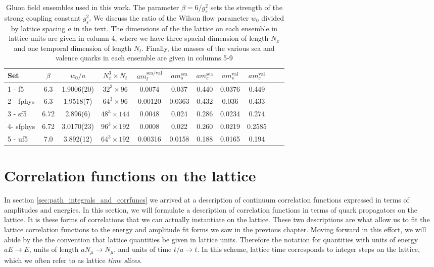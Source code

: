 \begin{table}
\caption{Gluon field ensembles used in this work.  The parameter $\beta=6/g_s^2$ sets the strength of the strong coupling constant $g_s^2$.  We discuss the ratio of the Wilson flow parameter $w_0$ divided by lattice spacing $a$ in the text.  The dimensions of the the lattice on each ensemble in lattice units are given in column 4, where we have three spacial dimension of length $N_x$ and one temporal dimension of length $N_t$.  Finally, the masses of the various sea and valence quarks in each ensemble are given in columns 5-9}%
\begin{center} 
\begin{tabular}{l c c c c c c c c c c}
\hline
    Set & $\beta$ & $w_0/a$ &  $N_x^3\times N_t$  &    $am_{l}^{\mathrm{sea/val}}$ & $am_{s}^{\mathrm{sea}}$ & $am_c^{\mathrm{sea}}$& $am_{s}^{\mathrm{val}}$ & $am_c^{\mathrm{val}}$ \\
\hline
\hline
    1 - f5   &  6.3    &  1.9006(20)   & $32^3\times 96$  &    0.0074       &   0.037        &  0.440&  0.0376  &  0.449 \\
\hline
    2 - fphys   &  6.3  & 1.9518(7)   & $64^3\times 96$    &   0.00120       &  0.0363         &  0.432&   0.036  &  0.433 \\
\hline
    3 - sf5   & 6.72    &  2.896(6)  & $48^3\times 144$    &   0.0048       &  0.024         &  0.286& 0.0234 &  0.274 \\
\hline
    4- sfphys   &  6.72 & 3.0170(23)   & $96^3\times 192$    &   0.0008       &  0.022         &  0.260&   0.0219  &  0.2585 \\
\hline
    5 - uf5   &  7.0    &   3.892(12) & $64^3\times 192$    &  0.00316       &  0.0158         &  0.188& 0.0165 &  0.194 \\
\hline
\hline
\end{tabular}
\end{center}
\label{tab:ensembles}
\end{table}

\section{Correlation functions on the lattice}\label{sec:correlation_functions_lattice}
In section \ref{sec:path_integrals_and_corrfuncs} we arrived at a description of continuum correlation functions expressed in terms of amplitudes and energies.  In this section, we will  formulate a description of correlation functions in terms of quark propagators on the lattice.  It is these forms of correlations that we can actually instantiate on the lattice.  These two descriptions are what allow us to fit the lattice correlation functions to the energy and amplitude fit forms we saw in the previous chapter.  Moving forward in this effort, we will abide by the the convention that lattice quantities be given in lattice units.  Therefore the notation for quantities with units of energy $aE\rightarrow E$, units of length $aN_\mu\rightarrow N_\mu$, and units of time $t/a \rightarrow t$.  In this scheme, lattice time corresponds to integer steps on the lattice, which we often refer to as lattice \textit{time slices}.

